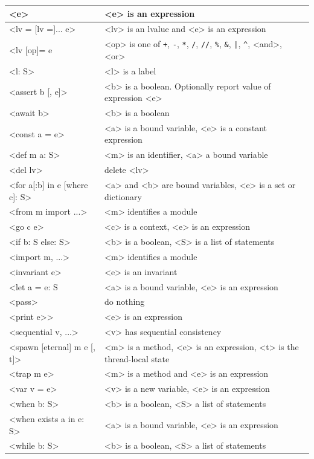 \documentclass{report}
\begin{document}
\vspace{1em}
\begin{tabular}{|l|l|}
\hline
<{e}> & <{e}> is an expression\\
\hline
<{lv = [lv =]... e}> & <{lv}> is an lvalue and <{e}> is an expression\\
\hline
<{lv} [op]= e}> & <{op}> is one of \texttt{+}, \texttt{-},
\texttt{*}, \texttt{/}, \texttt{//}, \texttt{\%},
\texttt{\&}, \texttt{|}, \texttt{\^}, <{and}>, <{or}>\\
\hline
<{l: S}> & <{l}> is a label \\
\hline
<{assert b [, e]}> & <{b}> is a boolean.  Optionally report value of expression <{e}>\\
\hline
<{await b}> & <{b}> is a boolean\\
\hline
<{const a = e}> & <{a}> is a bound variable, <{e}> is a constant expression\\
\hline
<{def m a: S}> & <{m}> is an identifier, <{a}> a bound variable\\
\hline
<{del lv}> & delete <{lv}>\\
\hline
<{for a[:b] in e [where c]: S}> & <{a}> and <{b}> are bound variables, <{e}> is a set or dictionary \\
\hline
<{from m import ...}> & <{m}> identifies a module \\
\hline
<{go c e}> & <{c}> is a context, <{e}> is an expression \\
\hline
<{if b: S else: S}> & <{b}> is a boolean, <{S}> is a list of statements\\
\hline
<{import m, ...}> & <{m}> identifies a module \\
\hline
<{invariant e}> & <{e}> is an invariant\\
\hline
<{let a = e: S} & <{a}> is a bound variable, <{e}> is an expression\\
\hline
<{pass}> & do nothing\\
\hline
<{print e>}> & <{e}> is an expression \\
\hline
<{sequential v, ...}> & <{v}> has sequential consistency \\
\hline
<{spawn [eternal] m e [, t]}> & <{m}> is a method,
<{e}> is an expression, <{t}> is the thread-local state \\
\hline
<{trap m e}> & <{m}> is a method and <{e}> is an expression \\
\hline
<{var v = e}> & <{v}> is a new variable, <{e}> is an expression\\
\hline
<{when b: S}> & <{b}> is a boolean, <{S}> a list of statements\\
\hline
<{when exists a in e: S}> & <{a}> is a bound variable, <{e}> is an expression\\
\hline
<{while b: S}> & <{b}> is a boolean, <{S}> a list of statements\\
\hline
\end{tabular}
\end{document}
